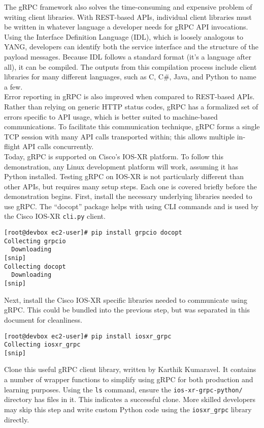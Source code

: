 The gRPC framework also solves the time-consuming and expensive problem of
writing client libraries. With REST-based APIs, individual client libraries
must be written in whatever language a developer needs for gRPC API
invocations. Using the Interface Definition Language (IDL), which is loosely
analogous to YANG, developers can identify both the service interface and the
structure of the payload messages. Because IDL follows a standard format (it's
a language after all), it can be compiled. The outputs from this compilation
process include client libraries for many different languages, such as C, C\#,
Java, and Python to name a few. \\

Error reporting in gRPC is also improved when compared to REST-based APIs.
Rather than relying on generic HTTP status codes, gRPC has a formalized set of
errors specific to API usage, which is better suited to machine-based
communications. To facilitate this communication technique, gRPC forms a
single TCP session with many API calls transported within; this allows
multiple in-flight API calls concurrently. \\

Today, gRPC is supported on Cisco's IOS-XR platform. To follow this
demonstration, any Linux development platform will work, assuming it has
Python installed. Testing gRPC on IOS-XR is not particularly different than
other APIs, but requires many setup steps. Each one is covered briefly before
the demonstration begins. First, install the necessary underlying libraries
needed to use gRPC\@. The ``docopt'' package helps with using CLI commands and is
used by the Cisco IOS-XR \verb|cli.py| client. \\

\begin{verbatim}
[root@devbox ec2-user]# pip install grpcio docopt
Collecting grpcio
  Downloading
[snip]
Collecting docopt
  Downloading
[snip]
\end{verbatim}

Next, install the Cisco IOS-XR specific libraries needed to communicate using
gRPC\@. This could be bundled into the previous step, but was separated in this
document for cleanliness.

\begin{verbatim}
[root@devbox ec2-user]# pip install iosxr_grpc
Collecting iosxr_grpc
[snip]
\end{verbatim}

Clone this useful gRPC client library, written by Karthik Kumaravel. It
contains a number of wrapper functions to simplify using gRPC for both
production and learning purposes. Using the \verb|ls| command, ensure the
\verb|ios-xr-grpc-python/| directory has files in it. This indicates a successful
clone. More skilled developers may skip this step and write custom Python code
using the \verb|iosxr_grpc| library directly.

